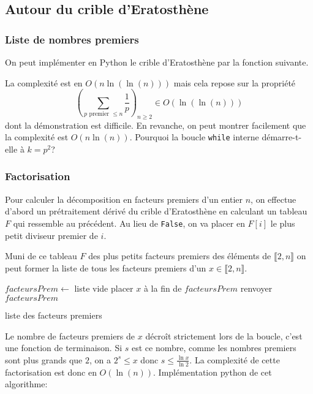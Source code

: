 \subsection{Autour du crible d'Eratosthène}
\subsubsection{Liste de nombres premiers}
On peut implémenter en Python le crible d'Eratosthène par la fonction suivante.

La complexité est en $O(n\ln(\ln(n)))$ mais cela repose sur la propriété
\begin{displaymath}
  \left( \sum_{p\text{ premier }\leq n} \frac{1}{p}\right)_{n\geq 2} \in O(\ln(\ln(n))) 
\end{displaymath}
dont la démonstration est difficile. En revanche, on peut montrer facilement que la complexité est $O(n\ln(n))$.\newline
Pourquoi la boucle \texttt{while} interne démarre-t-elle à $k=p^2$?

\subsubsection{Factorisation}
Pour calculer la décomposition en facteurs premiers d'un entier $n$, on effectue d'abord un prétraitement dérivé du crible d'Eratosthène en calculant un tableau $F$ qui ressemble au précédent. Au lieu de \texttt{False}, on va placer en $F[i]$ le plus petit diviseur premier de $i$.

Muni de ce tableau $F$ des plus petits facteurs premiers des éléments de $\llbracket 2,n\rrbracket$ on peut former la liste de tous les facteurs premiers d'un $x\in  \llbracket 2,n\rrbracket$.

\begin{algorithm}
  $facteursPrem \leftarrow$ liste vide \;
  placer $x$ à la fin de $facteursPrem$\;
  renvoyer $facteursPrem$ \;
  \caption{liste des facteurs premiers}
  \label{complexite_4}
\end{algorithm}
Le nombre de facteurs premiers de $x$ décroît strictement lors de la boucle, c'est une fonction de terminaison. Si $s$ est ce nombre, comme les nombres premiers sont plus grands que $2$, on a $2^s \leq x$ donc $s\leq \frac{\ln x}{\ln 2}$. La complexité de cette factorisation est donc en $O(\ln(n))$.\newline
Implémentation python de cet algorithme:


